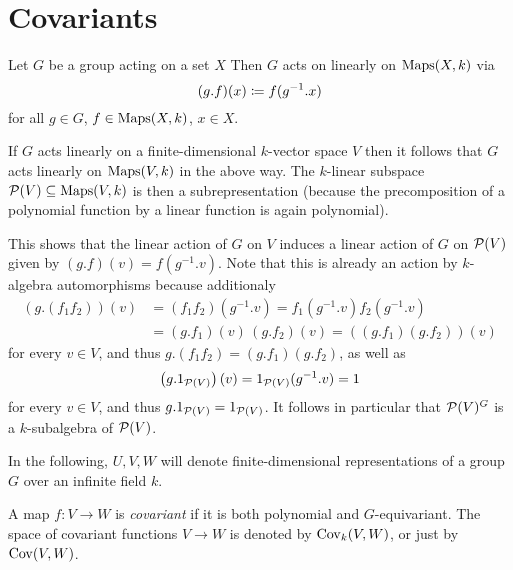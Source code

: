 \section{Covariants}


\begin{fluff}
  \label{fluff: induced action on polynomial algebra}
  Let $G$ be a group acting on a set $X$
  Then $G$ acts on linearly on $\operatorname{Maps}(X,k)$ via
  \[
              (g.f)(x)
    \coloneqq  f(g^{-1}.x)
  \]
  for all $g \in G$, $f \in \operatorname{Maps}(X,k)$, $x \in X$.
  
  If $G$ acts linearly on a finite-dimensional $k$-vector space $V$ then it follows that $G$ acts linearly on $\operatorname{Maps}(V,k)$ in the above way.
  The $k$-linear subspace $\mathcal{P}(V) \subseteq \operatorname{Maps}(V,k)$ is then a subrepresentation (because the precomposition of a polynomial function by a linear function is again polynomial).
  
  This shows that the linear action of $G$ on $V$ induces a linear action of $G$ on $\mathcal{P}(V)$ given by $(g.f)(v) = f(g^{-1}.v)$.
  Note that this is already an action by $k$-algebra automorphisms because additionaly
  \begin{align*}
        (g.(f_1 f_2))(v)
    &=  (f_1 f_2)(g^{-1}.v)
     =  f_1(g^{-1}.v) f_2(g^{-1}.v) \\
    &=  (g.f_1)(v) \, (g.f_2)(v)
     =  ((g.f_1) (g.f_2))(v)
  \end{align*}
  for every $v \in V$, and thus $g.(f_1 f_2) = (g.f_1)(g.f_2)$, as well as
  \[
      \left( g.1_{\mathcal{P}(V)} \right)(v)
    = 1_{\mathcal{P}(V)}(g^{-1}.v)
    = 1
  \]
  for every $v \in V$, and thus $g.1_{\mathcal{P}(V)} = 1_{\mathcal{P}(V)}$.
  It follows in particular that $\mathcal{P}(V)^G$ is a $k$-subalgebra of $\mathcal{P}(V)$.
\end{fluff}


\begin{conventions}
  In the following, $U, V, W$ will denote finite-dimensional representations of a group $G$ over an infinite field $k$.
\end{conventions}


\begin{definition}
  A map $f \colon V \to W$ is \emph{covariant} if it is both polynomial and $G$-equivariant.
  The space of covariant functions $V \to W$ is denoted by $\operatorname{Cov}_k(V,W)$, or just by $\operatorname{Cov}(V,W)$.
\end{definition}


